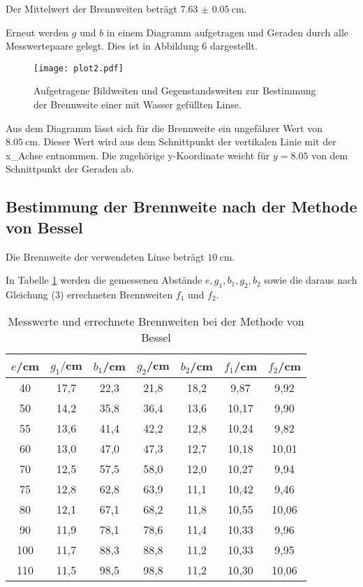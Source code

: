 Der Mittelwert der Brennweiten beträgt $\SI{7.63(5)}{\centi\meter}$.

Erneut werden $g$ und $b$ in einem Diagramm aufgetragen und Geraden durch alle Messwertepaare gelegt. Dies ist in Abbildung 6
dargestellt.

\begin{figure}[H]
  \centering
  \texttt{[image: plot2.pdf]}
  \caption{Aufgetragene Bildweiten und Gegenstandsweiten zur Bestimmung der Brennweite einer mit Wasser gefüllten Linse.}
  \label{fig:plot}
\end{figure}


Aus dem Diagramm lässt sich für die Brennweite ein ungefährer Wert von  $\SI{8.05}{\centi\meter}$. Dieser Wert wird aus
dem Schnittpunkt der vertikalen Linie mit der x_Achse entnommen. Die zugehörige y-Koordinate weicht für $y=8.05$ von dem
Schnittpunkt der Geraden ab.


\subsection{Bestimmung der Brennweite nach der Methode von Bessel}
Die Brennweite der verwendeten Linse beträgt $\SI{10}{\centi\meter}$.

In Tabelle \ref{tab:bessel} werden die gemessenen Abstände $e, g_1, b_1, g_2, b_2$ sowie die daraus nach Gleichung (3)
errechneten Brennweiten $f_1$ und $f_2$.
\begin{table}[H]
  \centering
  \caption{Messwerte und errechnete Brennweiten bei der Methode von Bessel}
  \label{tab:bessel}
  \begin{tabular}{c c c c c c c}
    \toprule
    $e$/cm  & $g_1/$cm & $b_1$/cm & $g_2$/cm & $b_2$/cm & $f_1$/cm & $f_2$/cm \\
    \midrule
    40  &   17,7  & 22,3  &  21,8 &   18,2 & 9,87  & 9,92 \\
    50   &  14,2  & 35,8   & 36,4  &  13,6 & 10,17 & 9,90 \\
    55   &  13,6  & 41,4   & 42,2  &  12,8 & 10,24 & 9,82 \\
    60  &   13,0  & 47,0   & 47,3  &  12,7 & 10,18 & 10,01 \\
    70  &   12,5 &  57,5  &  58,0  &  12,0 & 10,27 & 9,94 \\
    75  &   12,8 &  62,8  &  63,9  &  11,1 & 10,42 & 9,46 \\
    80  &   12,1 &  67,1  &  68,2  &  11,8 & 10,55 & 10,06 \\
    90  &   11,9 &  78,1  &  78,6  &  11,4 & 10,33 & 9,96 \\
    100  &  11,7 &  88,3  &  88,8  &  11,2 & 10,33 & 9,95 \\
    110  &  11,5 &  98,5  &  98,8  &  11,2 & 10,30 & 10,06  \\
    \bottomrule
  \end{tabular}
\end{table}


